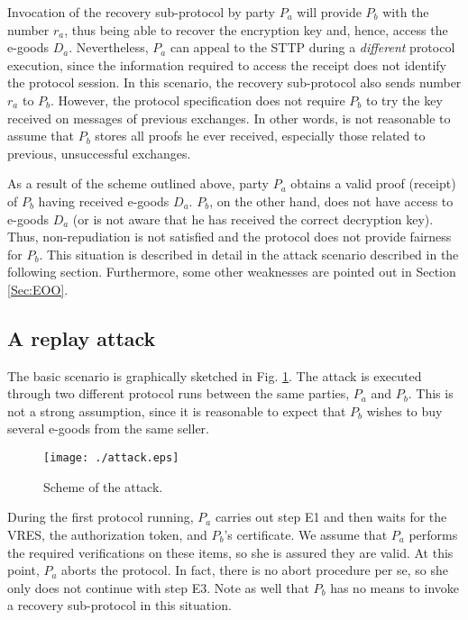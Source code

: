 \documentclass{article}
\begin{document}
Invocation of the recovery sub-protocol by party $P_a$ will provide
$P_b$ with the number $r_a$, thus being able to recover the
encryption key and, hence, access the e-goods $D_a$. Nevertheless,
$P_a$ can appeal to the STTP during a \emph{different} protocol
execution, since the information required to access the receipt does
not identify the protocol session. In this scenario, the recovery
sub-protocol also sends number $r_a$ to $P_b$. However, the protocol
specification does not require $P_b$ to try the key received on
messages of previous exchanges. In other words, is not reasonable to
assume that $P_b$ stores all proofs he ever received, especially
those related to previous, unsuccessful exchanges.

As a result of the scheme outlined above, party $P_a$ obtains a
valid proof (receipt) of $P_b$ having received e-goods $D_a$. $P_b$,
on the other hand, does not have access to e-goods $D_a$ (or is not
aware that he has received the correct decryption key). Thus,
non-repudiation is not satisfied and the protocol does not provide
fairness for $P_b$. This situation is described in detail in the
attack scenario described in the following section. Furthermore,
some other weaknesses are pointed out in Section \ref{Sec:EOO}.

\subsection{A replay attack}\label{Sec:ReplayAttack}
The basic scenario is graphically sketched in Fig.
\ref{Fig:SchemeAttack}. The attack is executed through two different
protocol runs between the same parties, $P_a$ and $P_b$. This is not
a strong assumption, since it is reasonable to expect that $P_b$
wishes to buy several e-goods from the same seller.

\begin{figure}[t]
\begin{center}
\texttt{[image: ./attack.eps]}
\end{center}
\caption{Scheme of the attack.} \label{Fig:SchemeAttack}
\end{figure}

During the first protocol running, $P_a$ carries out step E1 and
then waits for the VRES, the authorization token, and $P_b$'s
certificate. We assume that $P_a$ performs the required
verifications on these items, so she is assured they are valid. At
this point, $P_a$ aborts the protocol. In fact, there is no abort
procedure per se, so she only does not continue with step E3. Note
as well that $P_b$ has no means to invoke a recovery sub-protocol in
this situation.
\end{document}
